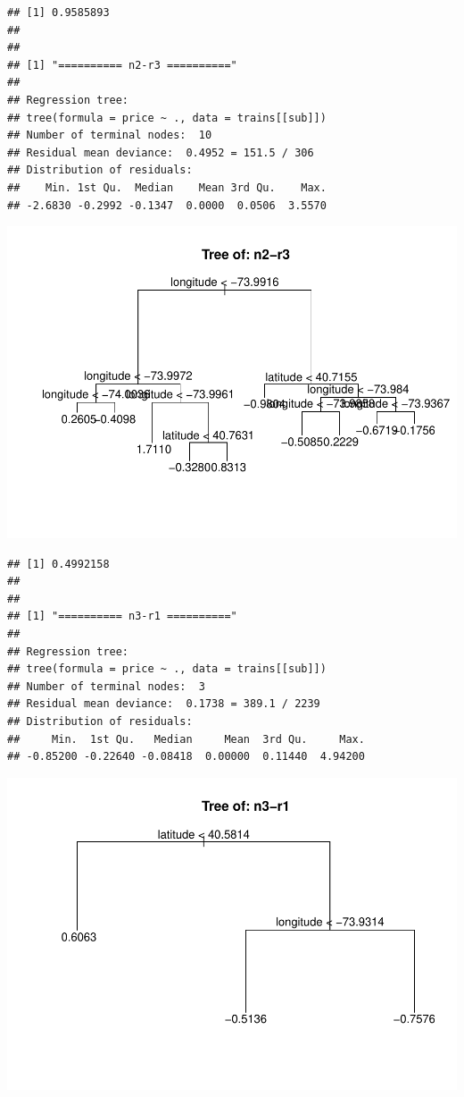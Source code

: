 \documentclass[
]{article}
\begin{document}
\begin{verbatim}
## [1] 0.9585893
## 
## 
## [1] "========== n2-r3 =========="
## 
## Regression tree:
## tree(formula = price ~ ., data = trains[[sub]])
## Number of terminal nodes:  10 
## Residual mean deviance:  0.4952 = 151.5 / 306 
## Distribution of residuals:
##    Min. 1st Qu.  Median    Mean 3rd Qu.    Max. 
## -2.6830 -0.2992 -0.1347  0.0000  0.0506  3.5570
\end{verbatim}

\includegraphics{project-code_files/figure-latex/unnamed-chunk-14-11.pdf}

\begin{verbatim}
## [1] 0.4992158
## 
## 
## [1] "========== n3-r1 =========="
## 
## Regression tree:
## tree(formula = price ~ ., data = trains[[sub]])
## Number of terminal nodes:  3 
## Residual mean deviance:  0.1738 = 389.1 / 2239 
## Distribution of residuals:
##     Min.  1st Qu.   Median     Mean  3rd Qu.     Max. 
## -0.85200 -0.22640 -0.08418  0.00000  0.11440  4.94200
\end{verbatim}

\includegraphics{project-code_files/figure-latex/unnamed-chunk-14-12.pdf}
\end{document}

